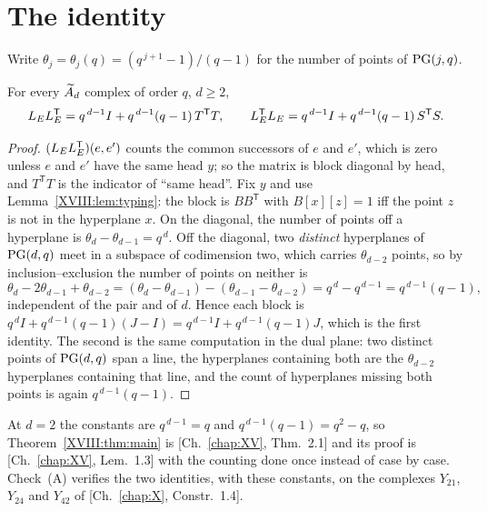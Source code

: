 \section{The identity}\label{XVIII:sec:identity}

Write $\theta_j=\theta_j(q)=(q^{\,j+1}-1)/(q-1)$ for the number of points of $\mathrm{PG}(j,q)$.

\begin{theorem}\label{XVIII:thm:main}
For every $\widetilde A_{d}$ complex of order $q$, $d\ge2$,
\[
L_EL_E^{\mathsf T}=q^{\,d-1}I+q^{\,d-1}(q-1)\,T^{\mathsf T}T,
\qquad
L_E^{\mathsf T}L_E=q^{\,d-1}I+q^{\,d-1}(q-1)\,S^{\mathsf T}S .
\]
\end{theorem}

\begin{proof}
$(L_EL_E^{\mathsf T})(e,e')$ counts the common successors of $e$ and $e'$, which is zero
unless $e$ and $e'$ have the same head $y$; so the matrix is block diagonal by head, and
$T^{\mathsf T}T$ is the indicator of ``same head''. Fix $y$ and use
Lemma~\ref{XVIII:lem:typing}: the block is $BB^{\mathsf T}$ with $B[x][z]=1$ iff the point $z$
is not in the hyperplane $x$. On the diagonal, the number of points off a hyperplane is
$\theta_d-\theta_{d-1}=q^{\,d}$. Off the diagonal, two \emph{distinct} hyperplanes of
$\mathrm{PG}(d,q)$ meet in a subspace of codimension two, which carries $\theta_{d-2}$ points, so
by inclusion--exclusion the number of points on neither is
\[
\theta_d-2\theta_{d-1}+\theta_{d-2}
=(\theta_d-\theta_{d-1})-(\theta_{d-1}-\theta_{d-2})
=q^{\,d}-q^{\,d-1}=q^{\,d-1}(q-1),
\]
independent of the pair and of $d$. Hence each block is
$q^{\,d}I+q^{\,d-1}(q-1)(J-I)=q^{\,d-1}I+q^{\,d-1}(q-1)J$, which is the first identity.
The second is the same computation in the dual plane: two distinct points of $\mathrm{PG}(d,q)$
span a line, the hyperplanes containing both are the $\theta_{d-2}$ hyperplanes containing
that line, and the count of hyperplanes missing both points is again $q^{\,d-1}(q-1)$.
\end{proof}

\begin{remark}\label{XVIII:rem:d2}
At $d=2$ the constants are $q^{\,d-1}=q$ and $q^{\,d-1}(q-1)=q^2-q$, so
Theorem~\ref{XVIII:thm:main} is [Ch.~\ref{chap:XV}, Thm.~2.1] and its proof is [Ch.~\ref{chap:XV}, Lem.~1.3] with the
counting done once instead of case by case. Check~(A) verifies the two identities, with
these constants, on the complexes $Y_{21}$, $Y_{24}$ and $Y_{42}$ of [Ch.~\ref{chap:X}, Constr.~1.4].
\end{remark}


